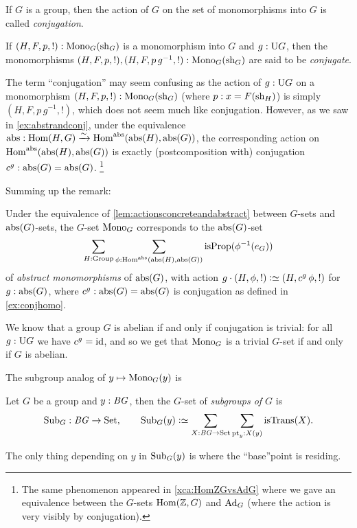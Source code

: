\begin{definition}
  \label{def:conjactonmonos}
  If $G$ is a group, then the action of $G$ on the set of monomorphisms into $G$ is called \emph{conjugation}. 

  \label{def:conjugate}
  If $(H,F,p,!):\mathrm{Mono}_G(\mathrm{sh}_G)$ is a monomorphism into $G$ and $g:\mathrm{U} G$, then the monomorphisms  $(H,F,p,!),(H,F,p\,g^{-1},!):\mathrm{Mono}_G(\mathrm{sh}_G)$ are said to be \emph{conjugate}. 
\end{definition}
\begin{remark}
  \label{rem:whyconjugate}
  The term ``conjugation'' may seem confusing as the %
action of $g:\mathrm{U} G$ on a monomorphism $(H,F,p,!):\mathrm{Mono}_G(\mathrm{sh}_G)$ (where $p:x=F(\mathrm{sh}_H)$) is simply $(H,F,p\,g^{-1},!)$, which does not seem much like conjugation.  
However, as we saw in \cref{ex:abstrandconj}, under the equivalence $\abstr:\Hom(H,G)\we\Hom^\abstr(\abstr(H),\abstr(G))$, the corresponding action on $\Hom^\abstr(\abstr(H),\abstr(G))$ is exactly (postcomposition with) conjugation $c^g:\mathrm{abs}(G)=\mathrm{abs}(G)$.  
\footnote{The same phenomenon appeared in \cref{xca:HomZGvsAdG} where we gave an equivalence between the $G$-sets $\Hom(\ZZ,G)$ and $\Ad_G$ (where the action is very visibly by conjugation).}
  \label{rem:conjactiononmonos}
\end{remark}
Summing up the remark:
\begin{lemma}
  \label{lem:conjugationabstractly}
  Under the equivalence of \cref{lem:actionsconcreteandabstract} between $G$-sets and $\mathrm{abs}(G)$-sets, the $G$-set $\mathrm{Mono}_G$ corresponds to the $\mathrm{abs}(G)$-set
$$\sum_{H:\typegroup}\sum_{\phi:\Hom^\abstr(\abstr(H),\abstr(G))}\isprop(\phi^{-1}(e_G))$$ of \emph{abstract monomorphisms} of $\mathrm{abs}(G)$, with action $g\cdot(H,\phi,!)\defequi(H,c^g\,\phi,!)$ for $g:\mathrm{abs}(G)$, where  $c^g:\mathrm{abs}(G)=\mathrm{abs}(G)$ is conjugation as defined in \cref{ex:conjhomo}.
\end{lemma}
\begin{remark}
  \label{rem:typeofsubgpstrivifab}
  We know that a group $G$ is abelian if and only if conjugation is trivial: for all $g:\mathrm{U} G$ we have $c^g=\mathord{\mathrm{id}}$, and so we get that $\mathrm{Mono}_G$ is a trivial $G$-set if and only if $G$ is abelian.
\end{remark}

The subgroup analog of $y\mapsto\mathrm{Mono}_G(y)$ is

\begin{definition}
  Let $G$ be a group and $y:\mathit{B}\mathit{G}$, then the $G$-set of \emph{subgroups of $G$} is
  $$\typesubgroup_G:\BG\to\Set,\qquad\typesubgroup_G(y)\defequi\sum_{X:\BG\to\Set}\sum_{\pt_y:X(y)}\mathrm{isTrans}(X).$$
\end{definition}
The only thing depending on $y$ in $\mathrm{Sub}_G(y)$ is where the ``base''point is residing.

